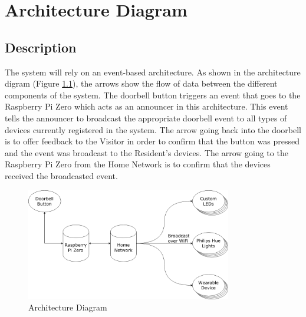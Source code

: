 \chapter{Architecture Diagram}

\section{Description}
The system will rely on an event-based architecture. As shown in the architecture digram (Figure \ref{fig:architecture}), the arrows show the flow of data between the different components of the system. The doorbell button triggers an event that goes to the Raspberry Pi Zero which acts as an announcer in this architecture. This event tells the announcer to broadcast the appropriate doorbell event to all types of devices currently registered in the system. The arrow going back into the doorbell is to offer feedback to the Visitor in order to confirm that the button was pressed and the event was broadcast to the Resident's devices. The arrow going to the Raspberry Pi Zero from the Home Network is to confirm that the devices received the broadcasted event.

\begin{figure}[h]
  \includegraphics[width=0.8\textwidth]{Architecture-new.png}
  \centering
  \caption{Architecture Diagram}
  \label{fig:architecture}
\end{figure}